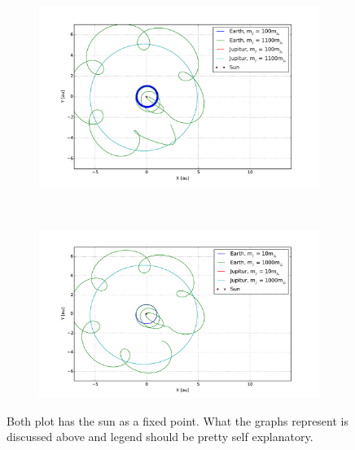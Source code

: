 \begin{figure}[H]
    \centering
    \begin{subfigure}{0.5\textwidth}
        \centering
        \includegraphics[width=\linewidth]{result/bilder/jupitur-mass-three.pdf}
    	\caption{}
    \end{subfigure}%
    ~ 
    \begin{subfigure}{0.5\textwidth}
        \centering
        \includegraphics[width=\linewidth]{result/bilder/jupitur-mass-two.pdf}
        \caption{}
    \end{subfigure}
    \caption{Both plot has the sun as a fixed point. What the graphs represent is discussed above and legend should be pretty self explanatory.}
    \label{fig:three-body-varying}
\end{figure}











